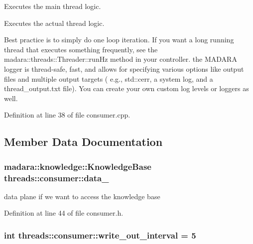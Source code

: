 Executes the main thread logic. 

Executes the actual thread logic.

Best practice is to simply do one loop iteration. If you want a long running thread that executes something frequently, see the madara\+::threads\+::\+Threader\+::run\+Hz method in your controller. the M\+A\+D\+A\+RA logger is thread-\/safe, fast, and allows for specifying various options like output files and multiple output targets ( e.\+g., std\+::cerr, a system log, and a thread\+\_\+output.\+txt file). You can create your own custom log levels or loggers as well.

Definition at line 38 of file consumer.\+cpp.



\subsection{Member Data Documentation}
\subsubsection[{\texorpdfstring{data\+\_\+}{data_}}]{\setlength{\rightskip}{0pt plus 5cm}madara\+::knowledge\+::\+Knowledge\+Base threads\+::consumer\+::data\+\_\+\hspace{0.3cm}{\ttfamily [private]}}\hypertarget{classthreads_1_1consumer_ad2ecf700b19fbc6c17f3de8b2e45f39a}{}\label{classthreads_1_1consumer_ad2ecf700b19fbc6c17f3de8b2e45f39a}


data plane if we want to access the knowledge base 



Definition at line 44 of file consumer.\+h.

\subsubsection[{\texorpdfstring{write\+\_\+out\+\_\+interval}{write_out_interval}}]{\setlength{\rightskip}{0pt plus 5cm}int threads\+::consumer\+::write\+\_\+out\+\_\+interval = 5\hspace{0.3cm}{\ttfamily [private]}}\hypertarget{classthreads_1_1consumer_a05d8e8f864be3a9abe4ea6d09dfad46c}{}\label{classthreads_1_1consumer_a05d8e8f864be3a9abe4ea6d09dfad46c}



